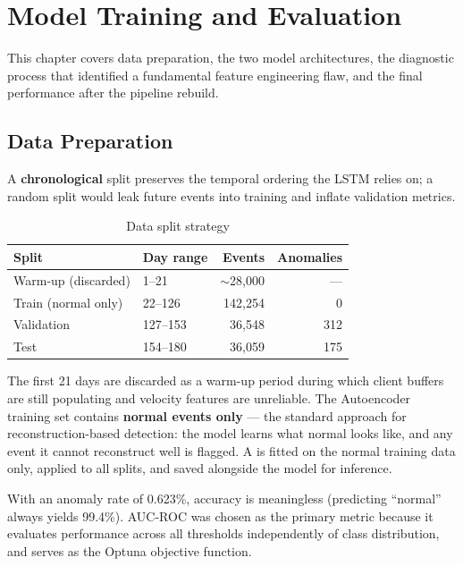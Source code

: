\chapter{Model Training and Evaluation}
\label{ch:training}

This chapter covers data preparation, the two model architectures, the diagnostic process that identified a fundamental feature engineering flaw, and the final performance after the pipeline rebuild.

\section{Data Preparation}

A \textbf{chronological} split preserves the temporal ordering the LSTM relies on; a random split would leak future events into training and inflate validation metrics.

\begin{table}[htbp]
\centering
\small
\caption{Data split strategy}
\begin{tabular}{@{}llrr@{}}
\toprule
\textbf{Split} & \textbf{Day range} & \textbf{Events} & \textbf{Anomalies} \\
\midrule
Warm-up (discarded) & 1--21 & $\sim$28{,}000 & --- \\
Train (normal only) & 22--126 & 142{,}254 & 0 \\
Validation & 127--153 & 36{,}548 & 312 \\
Test & 154--180 & 36{,}059 & 175 \\
\bottomrule
\end{tabular}
\end{table}

The first 21 days are discarded as a warm-up period during which client buffers are still populating and velocity features are unreliable. The Autoencoder training set contains \textbf{normal events only} --- the standard approach for reconstruction-based detection: the model learns what normal looks like, and any event it cannot reconstruct well is flagged. A  is fitted on the normal training data only, applied to all splits, and saved alongside the model for inference.

With an anomaly rate of 0.623\%, accuracy is meaningless (predicting ``normal'' always yields 99.4\%). AUC-ROC was chosen as the primary metric because it evaluates performance across all thresholds independently of class distribution, and serves as the Optuna objective function.

